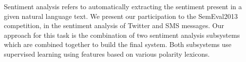 Sentiment analysis refers to automatically extracting the sentiment present in a given natural
 language text. We present our participation
 to the SemEval2013 competition, in the sentiment
 analysis of Twitter and SMS messages.
 Our approach for this task is the combination
 of two sentiment analysis subsystems which
 are combined together to build the final system.
 Both subsystems use supervised learning
 using features based on various polarity lexicons.

